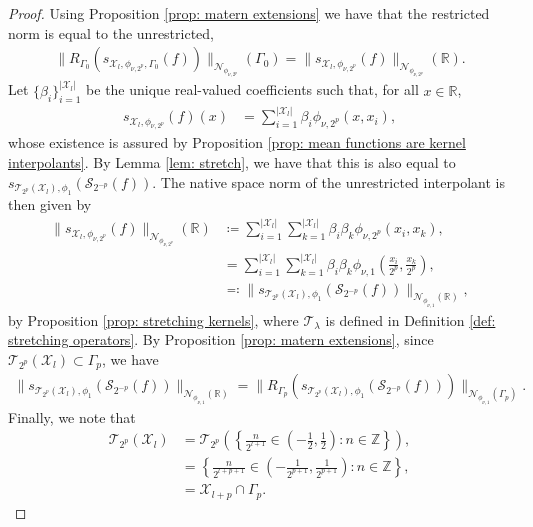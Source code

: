\documentclass[pdflatex,sn-mathphys-num]{sn-jnl}%
\theoremstyle{thmstyleone}%
\theoremstyle{thmstyletwo}%
\theoremstyle{thmstylethree}%
\begin{document}
\begin{proof}
    Using Proposition \ref{prop: matern extensions} we have that the restricted norm is equal to the unrestricted,
    \begin{align}
        \|R_{\Gamma_0}(s_{\mathcal{X}_l,\phi_{\nu,2^p},\Gamma_0}(f))\|_{\mathcal{N}_{\phi_{\nu,2^p}}}(\Gamma_0)=\|s_{\mathcal{X}_l,\phi_{\nu,2^p}}(f)\|_{\mathcal{N}_{\phi_{\nu,2^p}}}(\mathbb{R}).\nonumber
    \end{align}
    Let \(\{\beta_i\}_{i=1}^{|\mathcal{X}_l|}\) be the unique real-valued coefficients such that, for all \(x\in\mathbb{R}\),
    \begin{align}
        s_{\mathcal{X}_l,\phi_{\nu,2^p}}(f)(x)&=\sum_{i=1}^{|\mathcal{X}_l|}\beta_{i}\phi_{\nu,2^p}(x,x_i),\nonumber
    \end{align}
    whose existence is assured by Proposition \ref{prop: mean functions are kernel interpolants}. By Lemma \ref{lem: stretch}, we have that this is also equal to \(s_{\mathcal{T}_{2^p}(\mathcal{X}_l),\phi_{1}}(\mathcal{S}_{2^{-p}}(f))\). The native space norm of the unrestricted interpolant is then given by
    \begin{align}
        \|s_{\mathcal{X}_l,\phi_{\nu,2^p}}(f)\|_{\mathcal{N}_{\phi_{\nu,2^p}}}(\mathbb{R})&\coloneqq\sum_{i=1}^{|\mathcal{X}_l|}\sum_{k=1}^{|\mathcal{X}_l|}\beta_{i}\beta_{k}\phi_{\nu,2^p}(x_i,x_k),\nonumber\\
        &=\sum_{i=1}^{|\mathcal{X}_l|}\sum_{k=1}^{|\mathcal{X}_l|}\beta_{i}\beta_{k}\phi_{\nu,1}\left(\frac{x_i}{2^p},\frac{x_k}{2^p}\right),\nonumber\\
        &\eqqcolon \|s_{\mathcal{T}_{2^p}(\mathcal{X}_l),\phi_{1}}(\mathcal{S}_{2^{-p}}(f))\|_{\mathcal{N}_{\phi_{\nu,1}}(\mathbb{R})},\nonumber
    \end{align}
    by Proposition \ref{prop: stretching kernels}, where \(\mathcal{T}_{\lambda}\) is defined in Definition \ref{def: stretching operators}.
    By Proposition \ref{prop: matern extensions}, since \(\mathcal{T}_{2^p}(\mathcal{X}_l)\subset\Gamma_p\), we have
    \begin{align}
        \|s_{\mathcal{T}_{2^p}(\mathcal{X}_l),\phi_{1}}(\mathcal{S}_{2^{-p}}(f))\|_{\mathcal{N}_{\phi_{\nu,1}}(\mathbb{R})}=\|R_{\Gamma_p}(s_{\mathcal{T}_{2^p}(\mathcal{X}_l),\phi_{1}}(\mathcal{S}_{2^{-p}}(f)))\|_{\mathcal{N}_{\phi_{\nu,1}}(\Gamma_p)}.\nonumber
    \end{align}
    Finally, we note that
    \begin{align}
        \mathcal{T}_{2^p}(\mathcal{X}_l)&=\mathcal{T}_{2^p}\left(\left\{\frac{n}{2^{l+1}}\in\left(-\frac{1}{2},\frac{1}{2}\right):n\in\mathbb{Z}\right\}\right),\nonumber\\
        &=\left\{\frac{n}{2^{l+p+1}}\in\left(-\frac{1}{2^{p+1}},\frac{1}{2^{p+1}}\right):n\in\mathbb{Z}\right\},\nonumber\\
        &=\mathcal{X}_{l+p}\cap\Gamma_p.\nonumber
    \end{align}
\end{proof}
\end{document}
